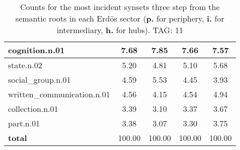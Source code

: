 \begin{table}[h!]
\begin{center}
\begin{tabular}{| l || c | c | c | c |}
cognition.n.01 & 7.68  & 7.85  & 7.66  & 7.57 \\\hline
state.n.02 & 5.20  & 4.81  & 5.10  & 5.68 \\\hline
social\_group.n.01 & 4.59  & 5.53  & 4.45  & 3.93 \\\hline
written\_communication.n.01 & 4.56  & 4.15  & 4.54  & 4.94 \\\hline
collection.n.01 & 3.39  & 3.10  & 3.37  & 3.67 \\\hline
part.n.01 & 3.38  & 3.07  & 3.30  & 3.75 \\\hline\hline
{{\bf total}} & 100.00  & 100.00  & 100.00  & 100.00 \\\hline
\end{tabular}
\caption{Counts for the most incident synsets three step from the semantic roots in each Erd\"os sector ({\bf p.} for periphery, {\bf i.} for intermediary, {\bf h.} for hubs). TAG: 11}
\end{center}
\end{table}